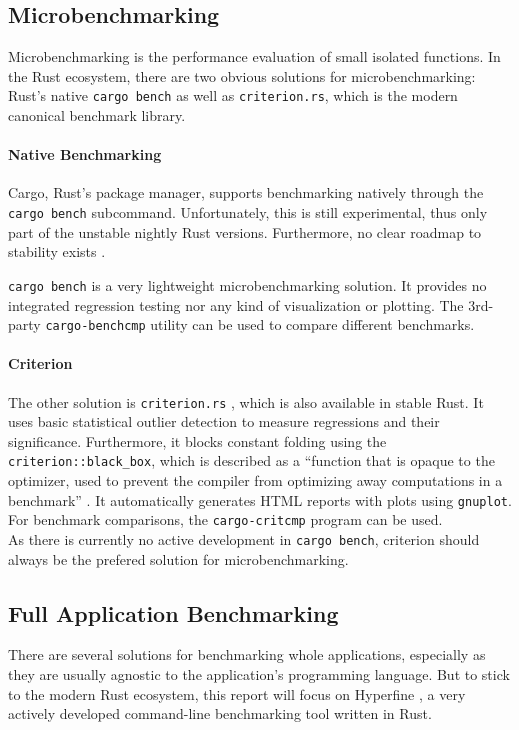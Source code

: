 \subsection{Microbenchmarking}
Microbenchmarking is the performance evaluation of small isolated functions. In the Rust ecosystem, there are two obvious solutions for microbenchmarking: Rust's native \texttt{cargo bench} as well as \texttt{criterion.rs}, which is the modern canonical benchmark library.

\paragraph{Native Benchmarking} Cargo, Rust's package manager, supports benchmarking natively through the \texttt{cargo bench} \cite{cargobench} subcommand. Unfortunately, this is still experimental, thus only part of the unstable nightly Rust versions. Furthermore, no clear roadmap to stability exists \cite{benchstable}.

\texttt{cargo bench} is a very lightweight microbenchmarking solution. It provides no integrated regression testing nor any kind of visualization or plotting. The 3rd-party \texttt{cargo-benchcmp} \cite{benchcmp} utility can be used to compare different benchmarks.

\paragraph{Criterion} The other solution is \texttt{criterion.rs} \cite{criterion}, which is also available in stable Rust. It uses basic statistical outlier detection to measure regressions and their significance. Furthermore, it blocks constant folding using the \texttt{criterion::black\_box}, which is described as a ``function that is opaque to the optimizer, used to prevent the compiler from optimizing away computations in a benchmark'' \cite{blackbox}. It automatically generates HTML reports with plots using \texttt{gnuplot}. For benchmark comparisons, the \texttt{cargo-critcmp} \cite{critcmp} program can be used.\\

As there is currently no active development in \texttt{cargo bench}, criterion should always be the prefered solution for microbenchmarking.

\subsection{Full Application Benchmarking}
There are several solutions for benchmarking whole applications, especially as they are usually agnostic to the application's programming language. But to stick to the modern Rust ecosystem, this report will focus on Hyperfine \cite{hyperfine}, a very actively developed command-line benchmarking tool written in Rust.\\

